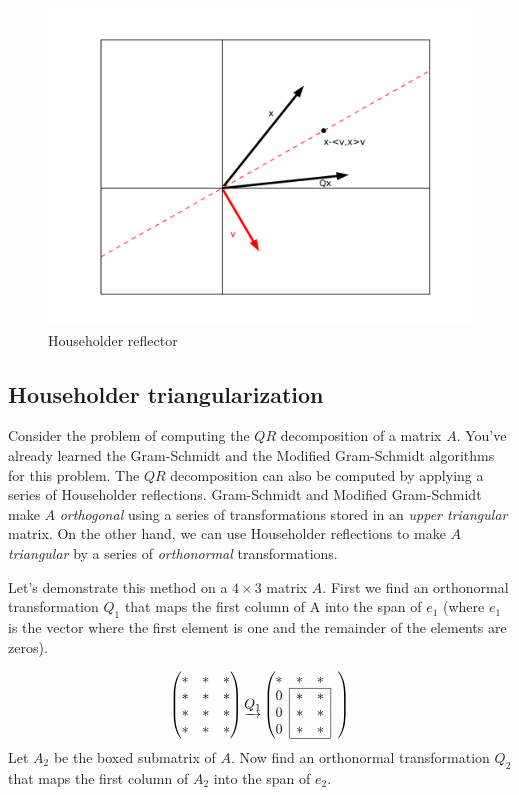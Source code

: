 \begin{figure}
	\centering
	\includegraphics[width= \textwidth]{fig1}
	\caption{Householder reflector}
	\label{fig:Householder_reflector}
\end{figure}

\subsection*{Householder triangularization}
Consider the problem of computing the $QR$ decomposition of a matrix $A$.
You've already learned the Gram-Schmidt and the Modified Gram-Schmidt algorithms for this problem.
The $QR$ decomposition can also be computed by applying a series of Householder reflections.
Gram-Schmidt and Modified Gram-Schmidt make $A$ \emph{orthogonal} using a series of transformations stored in an \emph{upper triangular} matrix.
On the other hand, we can use Householder reflections to make $A$ \emph{triangular} by a series of \emph{orthonormal} transformations.

Let's demonstrate this method on a $4 \times 3$ matrix $A$.
First we find an orthonormal transformation $Q_1$ that maps the first column of A into the span of $e_1$
(where $e_1$ is the vector where the first element is one and the remainder of the elements are zeros).

\def\mc#1{\multicolumn{1}{c|}{#1}}
\begin{equation*}
\begin{pmatrix}
* & * & * \\
* & * & * \\
* & * & * \\
* & * & *
\end{pmatrix}
\underrightarrow{Q_1}
\begin{pmatrix}

* & * & * & \\ \cline{2-3}
\mc{0} & * & \mc{*}& \\
\mc{0} & * & \mc{*} & \\
\mc{0}& * & \mc{*} & \\ \cline{2-3}
\end{pmatrix}
\end{equation*}
Let $A_2$ be the boxed submatrix of $A$.
Now find an orthonormal transformation $Q_2$ that maps the first column of $A_2$ into the span of $e_2$.


